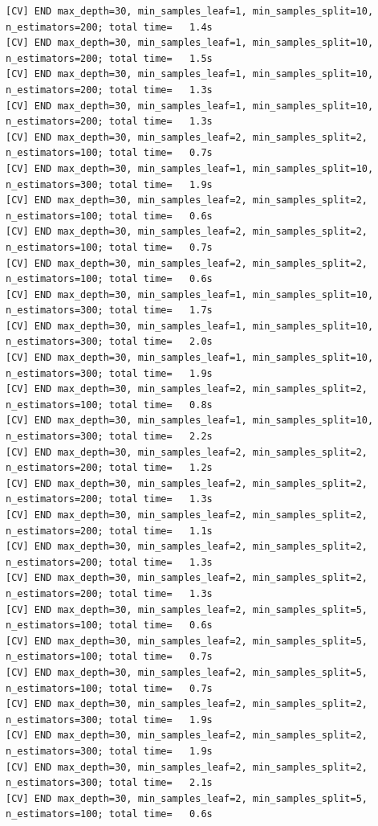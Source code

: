 \documentclass[
  11pt,
  letterpaper,
  DIV=11,
  numbers=noendperiod]{scrartcl}
\begin{document}
\begin{verbatim}
[CV] END max_depth=30, min_samples_leaf=1, min_samples_split=10, n_estimators=200; total time=   1.4s
[CV] END max_depth=30, min_samples_leaf=1, min_samples_split=10, n_estimators=200; total time=   1.5s
[CV] END max_depth=30, min_samples_leaf=1, min_samples_split=10, n_estimators=200; total time=   1.3s
[CV] END max_depth=30, min_samples_leaf=1, min_samples_split=10, n_estimators=200; total time=   1.3s
[CV] END max_depth=30, min_samples_leaf=2, min_samples_split=2, n_estimators=100; total time=   0.7s
[CV] END max_depth=30, min_samples_leaf=1, min_samples_split=10, n_estimators=300; total time=   1.9s
[CV] END max_depth=30, min_samples_leaf=2, min_samples_split=2, n_estimators=100; total time=   0.6s
[CV] END max_depth=30, min_samples_leaf=2, min_samples_split=2, n_estimators=100; total time=   0.7s
[CV] END max_depth=30, min_samples_leaf=2, min_samples_split=2, n_estimators=100; total time=   0.6s
[CV] END max_depth=30, min_samples_leaf=1, min_samples_split=10, n_estimators=300; total time=   1.7s
[CV] END max_depth=30, min_samples_leaf=1, min_samples_split=10, n_estimators=300; total time=   2.0s
[CV] END max_depth=30, min_samples_leaf=1, min_samples_split=10, n_estimators=300; total time=   1.9s
[CV] END max_depth=30, min_samples_leaf=2, min_samples_split=2, n_estimators=100; total time=   0.8s
[CV] END max_depth=30, min_samples_leaf=1, min_samples_split=10, n_estimators=300; total time=   2.2s
[CV] END max_depth=30, min_samples_leaf=2, min_samples_split=2, n_estimators=200; total time=   1.2s
[CV] END max_depth=30, min_samples_leaf=2, min_samples_split=2, n_estimators=200; total time=   1.3s
[CV] END max_depth=30, min_samples_leaf=2, min_samples_split=2, n_estimators=200; total time=   1.1s
[CV] END max_depth=30, min_samples_leaf=2, min_samples_split=2, n_estimators=200; total time=   1.3s
[CV] END max_depth=30, min_samples_leaf=2, min_samples_split=2, n_estimators=200; total time=   1.3s
[CV] END max_depth=30, min_samples_leaf=2, min_samples_split=5, n_estimators=100; total time=   0.6s
[CV] END max_depth=30, min_samples_leaf=2, min_samples_split=5, n_estimators=100; total time=   0.7s
[CV] END max_depth=30, min_samples_leaf=2, min_samples_split=5, n_estimators=100; total time=   0.7s
[CV] END max_depth=30, min_samples_leaf=2, min_samples_split=2, n_estimators=300; total time=   1.9s
[CV] END max_depth=30, min_samples_leaf=2, min_samples_split=2, n_estimators=300; total time=   1.9s
[CV] END max_depth=30, min_samples_leaf=2, min_samples_split=2, n_estimators=300; total time=   2.1s
[CV] END max_depth=30, min_samples_leaf=2, min_samples_split=5, n_estimators=100; total time=   0.6s

\end{verbatim}
\end{document}
